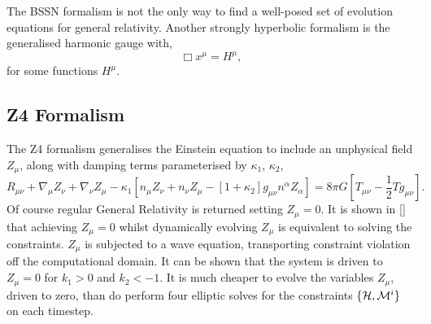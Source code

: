 The BSSN formalism is not the only way to find a well-posed set of evolution equations for general relativity. Another strongly hyperbolic formalism is the generalised harmonic gauge \cite{harmonic} with, 
\begin{equation}\Box x^\mu = H^\mu,\end{equation}
for some functions $H^\mu$.


\subsection{Z4 Formalism}
The Z4 formalism \cite{z4} generalises the Einstein equation to include an unphysical field $Z_\mu$, along with damping terms parameterised by $\kappa_1$, $\kappa_2$, 
\begin{equation}\label{nr:eq:z4einstein} R_{\mu\nu} + \nabla_\mu Z_\nu + \nabla_\nu Z_\mu - \kappa_1\left[ n_\mu Z_\nu + n_\nu Z_\mu - [1+\kappa_2]g_{\mu\nu}n^\alpha Z_\alpha\right] = 8\pi G \left[T_{\mu\nu}- \frac{1}{2}Tg_{\mu\nu} \right].\end{equation}
Of course regular General Relativity is returned setting $Z_\mu=0$. It is shown in [] that achieving $Z_\mu=0$ whilst dynamically evolving $Z_\mu$  is equivalent to solving the constraints. $Z_\mu$ is subjected to a wave equation, transporting constraint violation off the computational domain. It can be shown that the system is driven to $Z_\mu =0$ for $k_1>0$ and $k_2<-1$. It is much cheaper to evolve the variables $Z_\mu$, driven to zero, than do perform four elliptic solves for the constraints $\{\mathcal{H},\mathcal{M}^i\}$ on each timestep. 

